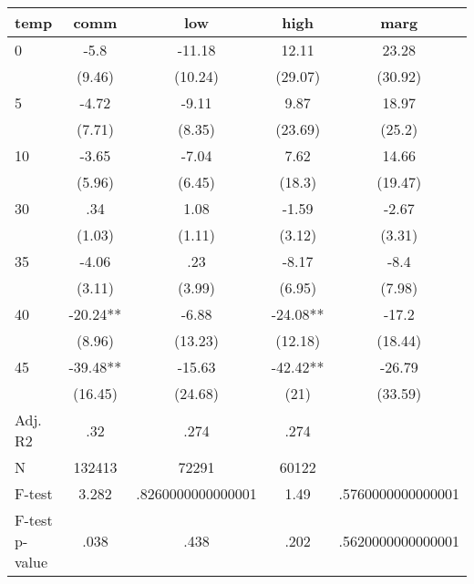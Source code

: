 \documentclass[]{article}
\begin{document}
\begin{tabular}{lcccc} \hline
temp & comm & low & high & marg \\ \hline
0 & -5.8 & -11.18 & 12.11 & 23.28 \\
 & (9.46) & (10.24) & (29.07) & (30.92) \\
5 & -4.72 & -9.11 & 9.87 & 18.97 \\
 & (7.71) & (8.35) & (23.69) & (25.2) \\
10 & -3.65 & -7.04 & 7.62 & 14.66 \\
 & (5.96) & (6.45) & (18.3) & (19.47) \\
30 & .34 & 1.08 & -1.59 & -2.67 \\
 & (1.03) & (1.11) & (3.12) & (3.31) \\
35 & -4.06 & .23 & -8.17 & -8.4 \\
 & (3.11) & (3.99) & (6.95) & (7.98) \\
40 & -20.24** & -6.88 & -24.08** & -17.2 \\
 & (8.96) & (13.23) & (12.18) & (18.44) \\
45 & -39.48** & -15.63 & -42.42** & -26.79 \\
 & (16.45) & (24.68) & (21) & (33.59) \\
\hline Adj. R2 & .32 & .274 & .274 &  \\
N & 132413 & 72291 & 60122 &  \\
F-test & 3.282 & .8260000000000001 & 1.49 & .5760000000000001 \\
 F-test p-value & .038 & .438 & .202 & .5620000000000001 \\ \hline
\end{tabular}
\end{document}
